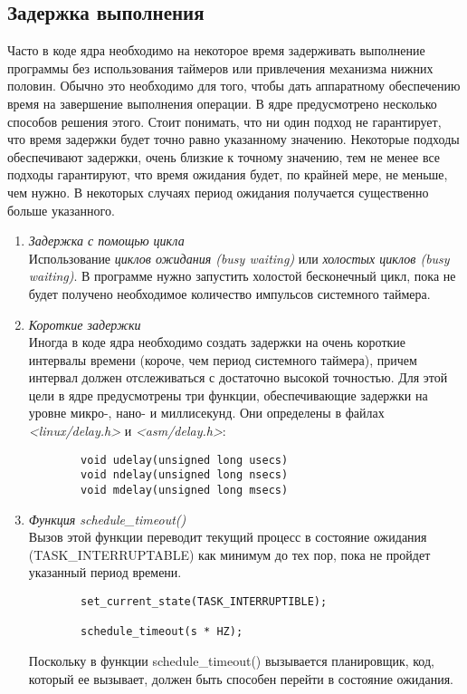     \subsection{Задержка выполнения}
    Часто в коде ядра необходимо на некоторое время задерживать выполнение программы без использования таймеров или привлечения механизма нижних половин. Обычно это необходимо для того, чтобы дать аппаратному обеспечению время на завершение выполнения операции. В ядре предусмотрено несколько способов решения этого. Стоит понимать, что ни один подход не гарантирует, что время задержки будет точно равно указанному значению. Некоторые подходы обеспечивают задержки, очень близкие к точному значению, тем не менее все подходы гарантируют, что время ожидания будет, по крайней мере, не меньше, чем нужно. В некоторых случаях период ожидания получается существенно больше указанного.
    \begin{enumerate}
    \item \textit{Задержка с помощью цикла}
    \\
    Использование \textit{циклов ожидания (busy waiting)} или \textit{холостых циклов (busy waiting)}. В программе нужно запустить холостой бесконечный цикл, пока не будет получено необходимое количество импульсов системного таймера.
    \item \textit{Короткие задержки}
    \\
    Иногда в коде ядра  необходимо создать задержки на очень короткие интервалы времени (короче, чем период системного таймера), причем интервал должен отслеживаться с достаточно высокой точностью. Для этой цели в ядре предусмотрены три функции, обеспечивающие задержки на уровне микро-, нано- и миллисекунд. Они определены в файлах \textit{<linux/delay.h>} и \textit{<asm/delay.h>}:
    \begin{lstlisting}
        void udelay(unsigned long usecs)
        void ndelay(unsigned long nsecs)
        void mdelay(unsigned long msecs)
    \end{lstlisting}
    \item \textit{Функция schedule\_timeout()}
    \\
    Вызов этой функции переводит текущий процесс в состояние ожидания (TASK\_INTERRUPTABLE) как минимум до тех пор, пока не пройдет указанный период времени.
    
    \begin{lstlisting}
        set_current_state(TASK_INTERRUPTIBLE);
        
        schedule_timeout(s * HZ);
    \end{lstlisting}
    Поскольку в функции schedule\_timeout() вызывается планировщик, код, который ее вызывает, должен быть способен перейти в состояние ожидания.
    \end{enumerate}